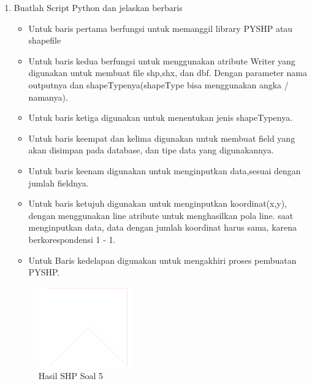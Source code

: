 \begin{enumerate}
	\item Buatlah Script Python dan jelaskan berbaris
	
	\begin{itemize}
		\item Untuk baris pertama berfungsi untuk memanggil library PYSHP atau shapefile
		\item Untuk baris kedua berfungsi untuk menggunakan atribute Writer yang digunakan untuk membuat file shp,shx, dan dbf. \hfill\break Dengan parameter nama outputnya dan shapeTypenya(shapeType bisa menggunakan angka / namanya).
		\item Untuk baris ketiga digunakan untuk menentukan jenis shapeTypenya.
		\item Untuk baris keempat dan kelima digunakan untuk membuat field yang akan disimpan pada database, dan tipe data yang digunakannya.
		\item Untuk baris keenam digunakan untuk menginputkan data,sesuai dengan jumlah fieldnya.
		\item Untuk baris ketujuh digunakan untuk menginputkan koordinat(x,y), dengan menggunakan line atribute untuk menghasilkan pola line. \hfill\break
		saat menginputkan data, data dengan jumlah koordinat harus sama, karena berkorespondensi 1 - 1.
		\item Untuk Baris kedelapan digunakan untuk mengakhiri proses pembuatan PYSHP.
	\end{itemize}
	\hfill\break
	\begin{figure}[H]
		\includegraphics[width=4cm]{figures/1174027/2/soal5.png}
		\centering
		\caption{Hasil SHP Soal 5}
	\end{figure}


\end{enumerate}
